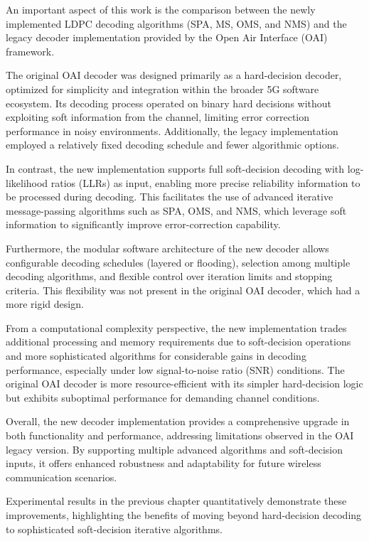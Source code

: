 \documentclass[../main.tex]{subfiles}
\begin{document}
An important aspect of this work is the comparison between the newly implemented LDPC decoding algorithms (SPA, MS, OMS, and NMS) and the legacy decoder implementation provided by the Open Air Interface (OAI) framework.

The original OAI decoder was designed primarily as a hard-decision decoder, optimized for simplicity and integration within the broader 5G software ecosystem. Its decoding process operated on binary hard decisions without exploiting soft information from the channel, limiting error correction performance in noisy environments. Additionally, the legacy implementation employed a relatively fixed decoding schedule and fewer algorithmic options.

In contrast, the new implementation supports full soft-decision decoding with log-likelihood ratios (LLRs) as input, enabling more precise reliability information to be processed during decoding. This facilitates the use of advanced iterative message-passing algorithms such as SPA, OMS, and NMS, which leverage soft information to significantly improve error-correction capability.

Furthermore, the modular software architecture of the new decoder allows configurable decoding schedules (layered or flooding), selection among multiple decoding algorithms, and flexible control over iteration limits and stopping criteria. This flexibility was not present in the original OAI decoder, which had a more rigid design.

From a computational complexity perspective, the new implementation trades additional processing and memory requirements due to soft-decision operations and more sophisticated algorithms for considerable gains in decoding performance, especially under low signal-to-noise ratio (SNR) conditions. The original OAI decoder is more resource-efficient with its simpler hard-decision logic but exhibits suboptimal performance for demanding channel conditions.

Overall, the new decoder implementation provides a comprehensive upgrade in both functionality and performance, addressing limitations observed in the OAI legacy version. By supporting multiple advanced algorithms and soft-decision inputs, it offers enhanced robustness and adaptability for future wireless communication scenarios.

Experimental results in the previous chapter quantitatively demonstrate these improvements, highlighting the benefits of moving beyond hard-decision decoding to sophisticated soft-decision iterative algorithms.
\end{document}

